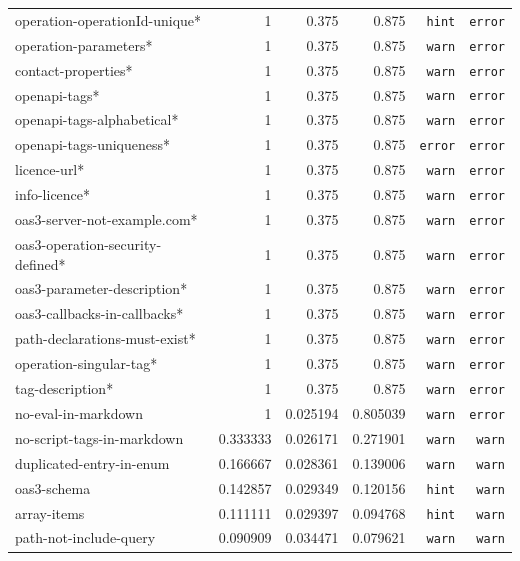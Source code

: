 {\begin{longtable}{lrrrrr}
  operation-operationId-unique* & 1 &  0.375 & 0.875 & \texttt{hint} & \texttt{error} \\ 
  operation-parameters* & 1 &  0.375 & 0.875 & \texttt{warn} & \texttt{error} \\ 
  contact-properties* & 1 &  0.375 & 0.875 & \texttt{warn} & \texttt{error} \\ 
  openapi-tags* & 1 &  0.375 & 0.875 & \texttt{warn} & \texttt{error} \\ 
  openapi-tags-alphabetical* &  1 &  0.375 & 0.875 & \texttt{warn} & \texttt{error} \\ 
  openapi-tags-uniqueness* &  1 &  0.375 & 0.875 & \texttt{error} & \texttt{error} \\ 
  licence-url* &  1 &  0.375 & 0.875 & \texttt{warn} & \texttt{error} \\ 
  info-licence* & 1 &  0.375 & 0.875 & \texttt{warn} & \texttt{error} \\ 
  oas3-server-not-example.com* &  1 &  0.375 & 0.875 & \texttt{warn} & \texttt{error} \\ 
  oas3-operation-security-defined* &  1 &  0.375 & 0.875 & \texttt{warn} & \texttt{error} \\ 
  oas3-parameter-description* & 1 & 0.375 & 0.875 & \texttt{warn} & \texttt{error} \\ 
  oas3-callbacks-in-callbacks* &  1 &  0.375 & 0.875 & \texttt{warn} & \texttt{error} \\ 
  path-declarations-must-exist* & 1 &  0.375 & 0.875 & \texttt{warn} & \texttt{error} \\ 
  operation-singular-tag* & 1 &  0.375 & 0.875 & \texttt{warn} & \texttt{error} \\ 
  tag-description* &  1 &  0.375 & 0.875 & \texttt{warn} & \texttt{error} \\ 
  no-eval-in-markdown &  1 &  0.025194 & 0.805039 & \texttt{warn} & \texttt{error} \\ \hline
  no-script-tags-in-markdown & 0.333333 &  0.026171 & 0.271901 & \texttt{warn} &  \texttt{warn} \\ 
  duplicated-entry-in-enum & 0.166667 &  0.028361 & 0.139006 & \texttt{warn} &  \texttt{warn} \\ 
  oas3-schema &  0.142857 &  0.029349 & 0.120156 & \texttt{hint} &  \texttt{warn} \\ 
  array-items &  0.111111 &  0.029397 & 0.094768 & \texttt{hint} &  \texttt{warn} \\ 
  path-not-include-query & 0.090909 &  0.034471 & 0.079621 & \texttt{warn} &  \texttt{warn} \\ 

\end{longtable}}
